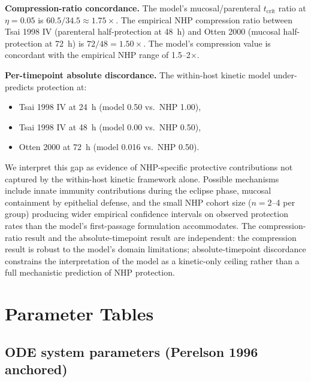\documentclass[11pt]{article}
\theoremstyle{definition}
\theoremstyle{remark}
\newcommand{\tcrit}{t_{\text{crit}}}
\begin{document}
\textbf{Compression-ratio concordance.} The model's mucosal/parenteral $\tcrit$ ratio at $\eta = 0.05$ is $60.5/34.5 \approx 1.75\times$. The empirical NHP compression ratio between Tsai 1998 IV (parenteral half-protection at 48~h) and Otten 2000 (mucosal half-protection at 72~h) is $72/48 = 1.50\times$. The model's compression value is concordant with the empirical NHP range of 1.5--2$\times$.

\textbf{Per-timepoint absolute discordance.} The within-host kinetic model under-predicts protection at:
\begin{itemize}[nosep,leftmargin=2em]
    \item Tsai 1998 IV at 24~h (model 0.50 vs.\ NHP 1.00),
    \item Tsai 1998 IV at 48~h (model 0.00 vs.\ NHP 0.50),
    \item Otten 2000 at 72~h (model 0.016 vs.\ NHP 0.50).
\end{itemize}
We interpret this gap as evidence of NHP-specific protective contributions not captured by the within-host kinetic framework alone. Possible mechanisms include innate immunity contributions during the eclipse phase, mucosal containment by epithelial defense, and the small NHP cohort size ($n = 2$--4 per group) producing wider empirical confidence intervals on observed protection rates than the model's first-passage formulation accommodates. The compression-ratio result and the absolute-timepoint result are independent: the compression result is robust to the model's domain limitations; absolute-timepoint discordance constrains the interpretation of the model as a kinetic-only ceiling rather than a full mechanistic prediction of NHP protection.

\section{Parameter Tables}

\subsection{ODE system parameters (Perelson 1996 anchored)}
\end{document}
